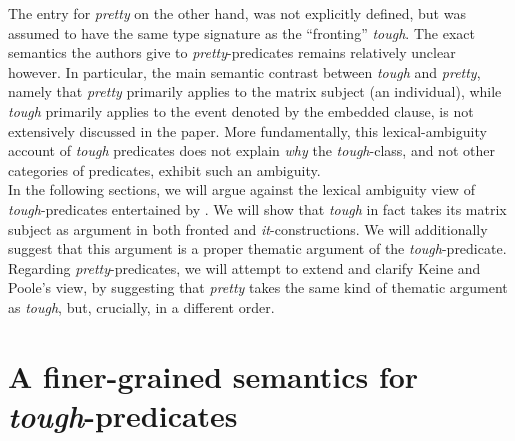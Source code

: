 \documentclass[11pt]{article}
\begin{document}
	
The entry for \textit{pretty} on the other hand, was not explicitly defined, but was assumed to have the same type signature as the ``fronting'' \textit{tough}. The exact semantics the authors give to \textit{pretty}-predicates remains relatively unclear however. In particular, the main semantic contrast between \textit{tough} and \textit{pretty}, namely that \textit{pretty} primarily applies to the matrix subject (an individual), while \textit{tough} primarily applies to the event denoted by the embedded clause, is not extensively discussed in the paper. More fundamentally, this lexical-ambiguity account of \textit{tough} predicates does not explain \textit{why} the \textit{tough}-class, and not other categories of predicates, exhibit such an ambiguity.\\
	
In the following sections, we will argue against the lexical ambiguity view of \textit{tough}-predicates entertained by \cite{Keine2017}. We will show that \textit{tough} in fact takes its matrix subject as argument in both fronted and \textit{it}-constructions. We will additionally suggest that this argument is a proper thematic argument of the \textit{tough}-predicate. Regarding \textit{pretty}-predicates, we will attempt to extend and clarify Keine and Poole's view, by suggesting that \textit{pretty} takes the same kind of thematic argument as \textit{tough}, but, crucially, in a different order. 
		

\section{A finer-grained semantics for \textit{tough}-predicates}\label{sec:semantics-tough}
\end{document}
